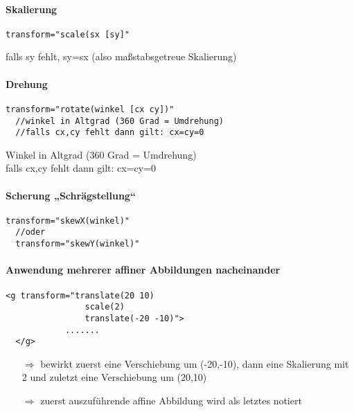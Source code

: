 \paragraph{Skalierung}\hspace{1mm}
\begin{lstlisting}[caption={Skalierung mit der transform Syntax}, label={lst:text-Tag}, language={SVG}]
  transform="scale(sx [sy]"
\end{lstlisting}
falls sy fehlt, sy=sx (also maßstabsgetreue Skalierung)

\paragraph{Drehung}\hspace{1mm}
\begin{lstlisting}[caption={Drehung mit der transform Syntax}, label={lst:text-Tag}, language={SVG}]
  transform="rotate(winkel [cx cy])"
  //winkel in Altgrad (360 Grad = Umdrehung)
  //falls cx,cy fehlt dann gilt: cx=cy=0
\end{lstlisting}
Winkel in Altgrad (360 Grad = Umdrehung)\\
falls cx,cy fehlt dann gilt: cx=cy=0

\paragraph{Scherung „Schrägstellung“}\hspace{1mm}
\begin{lstlisting}[caption={Scherung mit der transform Syntax}, label={lst:text-Tag}, language={SVG}]
  transform="skewX(winkel)"
  //oder
  transform="skewY(winkel)"
\end{lstlisting}

\paragraph{Anwendung mehrerer affiner Abbildungen nacheinander}\hspace{1mm}
\begin{lstlisting}[caption={Scherung mit der transform Syntax}, label={lst:text-Tag}, language={SVG}]
  <g transform="translate(20 10)
                scale(2)
                translate(-20 -10)">
            .......
  </g>
\end{lstlisting}
\begin{itemize}
\item[$\Rightarrow$]bewirkt zuerst eine Verschiebung um (-20,-10), dann eine Skalierung mit 2 und zuletzt eine Verschiebung um (20,10)
\item[$\Rightarrow$]zuerst auszuführende affine Abbildung wird als letztes notiert
\end{itemize}

